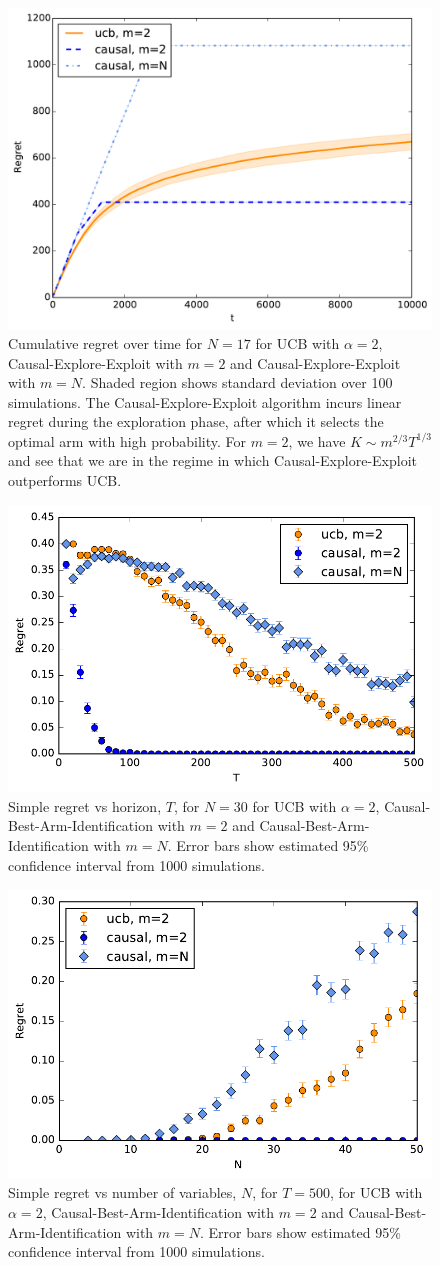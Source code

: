 \documentclass{article}
\theoremstyle{plain}
\theoremstyle{definition}
\begin{document}
\begin{figure}
\caption{Cumulative regret over time for $N = 17$ for UCB with $\alpha=2$, Causal-Explore-Exploit with $m=2$ and Causal-Explore-Exploit with $m=N$. Shaded region shows standard deviation over 100 simulations. The Causal-Explore-Exploit algorithm incurs linear regret during the exploration phase, after which it selects the optimal arm with high probability. For $m=2$, we have $K \sim m^{2/3}T^{1/3}$ and see that we are in the regime in which Causal-Explore-Exploit outperforms UCB.}
\label{fig:known_q_r_vs_t}
\centering
\includegraphics[width=.5\textwidth]{exp_regret_vs_t_T10000_N17_sims100_20151229_120647.pdf}
\end{figure}

\begin{figure}
\caption{Simple regret vs horizon, $T$, for $N = 30$ for UCB with $\alpha=2$, Causal-Best-Arm-Identification with $m=2$ and Causal-Best-Arm-Identification with $m=N$. Error bars show estimated 95\% confidence interval from 1000 simulations.}
\label{fig:simple_vs_T}
\centering
\includegraphics[width=.5\textwidth]{exp_simpleregret_vs_T_N30_sims1000_20160113_010512.pdf}
\end{figure}

\begin{figure}
\caption{Simple regret vs number of variables, $N$, for $T=500$, for UCB with $\alpha=2$, Causal-Best-Arm-Identification with $m=2$ and Causal-Best-Arm-Identification with $m=N$. Error bars show estimated 95\% confidence interval from 1000 simulations.}
\label{fig:simple_vs_N}
\centering
\includegraphics[width=.5\textwidth]{exp_simpleregret_vs_N_T500_sims1000_20160113_010511.pdf}
\end{figure}
\end{document}
